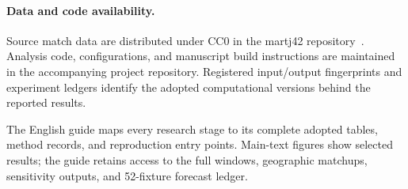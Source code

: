 \paragraph{Data and code availability.}
Source match data are distributed under CC0 in the martj42 repository~\citep{martj42_data}. Analysis code, configurations, and manuscript build instructions are maintained in the accompanying project repository. Registered input/output fingerprints and experiment ledgers identify the adopted computational versions behind the reported results.

The English guide  maps every research stage to its complete adopted tables, method records, and reproduction entry points. Main-text figures show selected results; the guide retains access to the full windows, geographic matchups, sensitivity outputs, and 52-fixture forecast ledger.

